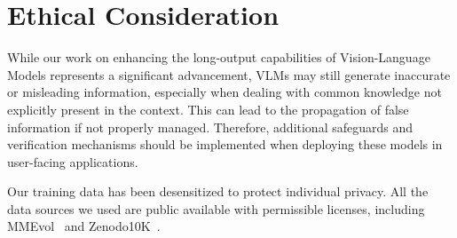 \section*{Ethical Consideration}
While our work on enhancing the long-output capabilities of Vision-Language Models represents a significant advancement,  VLMs may still generate inaccurate or misleading information, especially when dealing with common knowledge not explicitly present in the context. This can lead to the propagation of false information if not properly managed. Therefore, additional safeguards and verification mechanisms should be implemented when deploying these models in user-facing applications.


Our training data has been desensitized to protect individual privacy. All the data sources we used are public available with permissible licenses, including MMEvol~\cite{luo2024mmevol} and Zenodo10K~\cite{zheng2025pptagent}.


